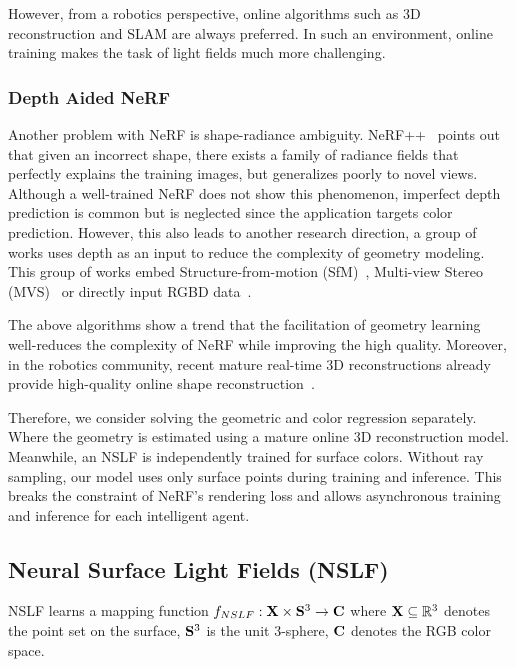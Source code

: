 However, from a robotics perspective, online algorithms such as 3D reconstruction and SLAM are always preferred.
In such an environment, online training makes the task of light fields much more challenging.

\subsubsection{Depth Aided NeRF}

Another problem with NeRF is shape-radiance ambiguity.  NeRF++~\cite{zhang2020nerf++} points out that given an incorrect shape, there exists a family of radiance fields that perfectly explains the training images, but generalizes poorly to novel views. 
Although a well-trained NeRF does not show this phenomenon, imperfect depth prediction is common but is neglected since the application targets color prediction.
However, this also leads to another research direction, a group of works uses depth as an input to reduce the complexity of geometry modeling. 
This group of works embed Structure-from-motion (SfM)~\cite{deng2021depth,xu2022point}, Multi-view Stereo (MVS)~\cite{chen2021mvsnerf,zhang2021learning} or directly input RGBD data~\cite{azinovic2021neural}. 

The above algorithms show a trend that the facilitation of geometry learning well-reduces the complexity of NeRF while improving the high quality.
Moreover, in the robotics community, recent mature real-time 3D reconstructions already provide high-quality online shape reconstruction~\cite{huang2021di}. 

Therefore, we consider solving the geometric and color regression separately. Where the geometry is estimated using a mature online 3D reconstruction model. Meanwhile, an NSLF is independently trained for surface colors.
Without ray sampling, our model uses only surface points during training and inference.
This breaks the constraint of NeRF's rendering loss and allows asynchronous training and inference for each intelligent agent.

\subsection{Neural Surface Light Fields (NSLF)}

NSLF learns a mapping function $f_{NSLF}:\mathbf X\times \mathbf S^3 \rightarrow \mathbf C$ where $\mathbf X \subseteq \mathbb R^3$ denotes the point set on the surface, $\mathbf S^3$ is the unit 3-sphere, $\mathbf C$ denotes the RGB color space.

